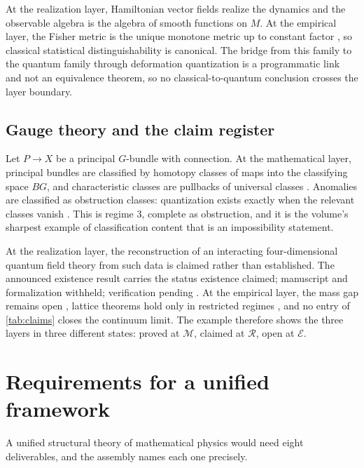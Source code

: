 \documentclass[11pt,letterpaper]{article}
\theoremstyle{definition}
\begin{document}
At the realization layer, Hamiltonian vector fields realize the dynamics and the observable algebra is the algebra of smooth functions on $M$. At the empirical layer, the Fisher metric is the unique monotone metric up to constant factor \cite{corpus-52}, so classical statistical distinguishability is canonical. The bridge from this family to the quantum family through deformation quantization is a programmatic link and not an equivalence theorem, so no classical-to-quantum conclusion crosses the layer boundary.

\subsection{Gauge theory and the claim register}

Let $P \to X$ be a principal $G$-bundle with connection. At the mathematical layer, principal bundles are classified by homotopy classes of maps into the classifying space $BG$, and characteristic classes are pullbacks of universal classes \cite{corpus-17,corpus-18}. Anomalies are classified as obstruction classes: quantization exists exactly when the relevant classes vanish \cite{corpus-19}. This is regime 3, complete as obstruction, and it is the volume's sharpest example of classification content that is an impossibility statement.

At the realization layer, the reconstruction of an interacting four-dimensional quantum field theory from such data is claimed rather than established. The announced existence result carries the status existence claimed; manuscript and formalization withheld; verification pending \cite{corpus-24,corpus-25}. At the empirical layer, the mass gap remains open \cite{corpus-23}, lattice theorems hold only in restricted regimes \cite{corpus-30,corpus-31,corpus-32}, and no entry of \cref{tab:claims} closes the continuum limit. The example therefore shows the three layers in three different states: proved at $\mathcal{M}$, claimed at $\mathcal{R}$, open at $\mathcal{E}$.

\section{Requirements for a unified framework}
\label{sec:requirements}

A unified structural theory of mathematical physics would need eight deliverables, and the assembly names each one precisely.
\end{document}
